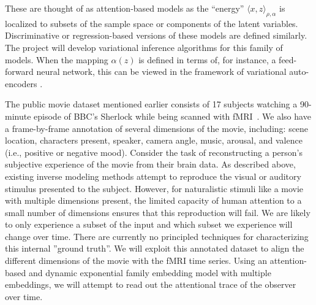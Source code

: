 These are thought of as attention-based models as the ``energy''
$\langle x, z\rangle_{\rho,\alpha}$ is localized to subsets of the
sample space or components of the latent variables. Discriminative or regression-based versions of these
models are defined similarly. The project will develop variational
inference algorithms for this family of models. When the mapping 
$\alpha(z)$ is defined in terms of, for instance, a feed-forward
neural network, this can be viewed in the framework of variational auto-encoders
\citep{kingma13}.


The public movie dataset mentioned earlier consists of 17 subjects
watching a 90-minute episode of BBC's Sherlock while being scanned with
fMRI~\citep{chen17,baldassano17}. We also have a frame-by-frame
annotation of several dimensions of the movie, including: scene
location, characters present, speaker, camera angle, music, arousal, and
valence (i.e., positive or negative mood). Consider the task of
reconstructing a person's subjective experience of the movie from their
brain data. As described above, existing inverse modeling methods
attempt to reproduce the visual or auditory stimulus presented to the
subject. However, for naturalistic stimuli like a movie with multiple
dimensions present, the limited capacity of human attention to a small
number of dimensions ensures that this reproduction will fail. We are
likely to only experience a subset of the input and which subset we
experience will change over time. There are currently no principled
techniques for characterizing this internal ''ground truth''. We will
exploit this annotated dataset to align the different dimensions of the
movie with the fMRI time series. Using an attention-based and dynamic
exponential family embedding model with multiple embeddings, we will
attempt to read out the attentional trace of the observer over time.


